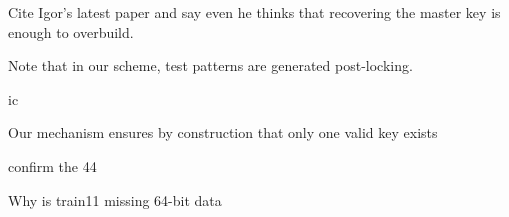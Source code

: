 Cite Igor's latest paper and say even he thinks that recovering the master key is enough to overbuild.

Note that in our scheme, test patterns are generated post-locking.

ic 

Our mechanism ensures by construction that only one valid key exists

confirm the 44

Why is train11 missing 64-bit data
